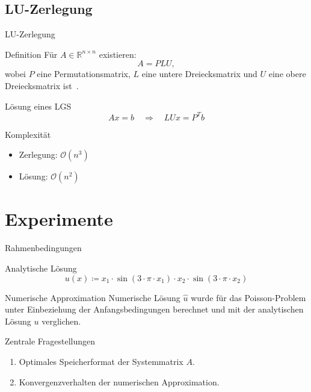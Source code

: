 \documentclass[9pt, t]{beamer}
\newcommand\R{\mathbb{R}}
\newcommand\BigO{\mathcal{O}}
\begin{document}
\subsection{LU-Zerlegung}

\begin{frame}{LU-Zerlegung}
    \begin{block}{Definition}
        Für \(A \in \R^{n \times n}\) existieren:
        \[
            A = PLU,
        \]
        wobei \(P\) eine Permutationsmatrix, \(L\) eine untere Dreiecksmatrix
        und \(U\) eine obere Dreiecksmatrix ist~\cite{LU}.
    \end{block}
    \pause%
    \begin{block}{Lösung eines LGS}
        \[
            A x = b \quad \Rightarrow \quad LU x = P^T b
        \]
    \end{block}
    \pause%
    \begin{block}{Komplexität}
        \begin{itemize}[<+->]
            \item Zerlegung: \(\BigO(n^3)\)
            \item Lösung: \(\BigO(n^2)\)
        \end{itemize}
    \end{block}
\end{frame}

\section{Experimente}

\begin{frame}{Rahmenbedingungen}
    \begin{block}{Analytische Lösung}
        \[
            u(x) \coloneq x_1 \cdot \sin(3 \cdot \pi \cdot x_1) \cdot x_2 \cdot \sin(3 \cdot \pi \cdot x_2)
        \]
    \end{block}
    \pause%
    \begin{block}{Numerische Approximation}
        Numerische Lösung \(\hat u\) wurde für das Poisson-Problem unter
        Einbeziehung der Anfangsbedingungen berechnet und mit der analytischen Lösung \(u\) verglichen.
    \end{block}
    \pause%
    \begin{block}{Zentrale Fragestellungen}
        \begin{enumerate}[<+->]
            \item Optimales Speicherformat der Systemmatrix \(A\).
            \item Konvergenzverhalten der numerischen Approximation.
        \end{enumerate}
    \end{block}
\end{frame}
\end{document}
